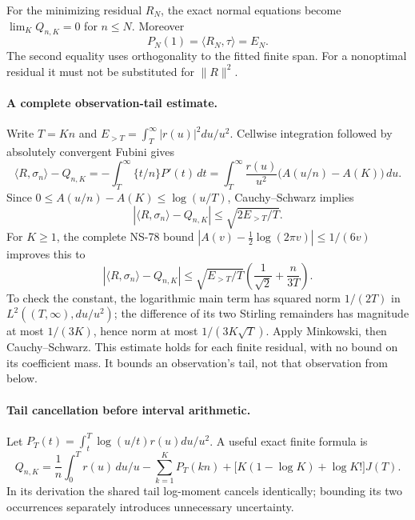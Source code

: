 For the minimizing residual $R_N$, the exact normal equations become
$\lim_K Q_{n,K}=0$ for $n\leq N$. Moreover
\begin{equation}
 P_N(1)=\langle R_N,\tau\rangle=E_N.
 \tag{86.2}
\end{equation}
The second equality uses orthogonality to the fitted finite span. For a
nonoptimal residual it must not be substituted for $\|R\|^2$.

\paragraph{A complete observation-tail estimate.}
Write $T=Kn$ and $E_{>T}=\int_T^\infty|r(u)|^2du/u^2$. Cellwise
integration followed by absolutely convergent Fubini gives
\begin{equation}
 \langle R,\sigma_n\rangle-Q_{n,K}
 =-\int_T^\infty\{t/n\}P'(t)\,dt
 =\int_T^\infty\frac{r(u)}{u^2}
                 \bigl(A(u/n)-A(K)\bigr)\,du.
 \tag{86.3}
\end{equation}
Since $0\leq A(u/n)-A(K)\leq\log(u/T)$, Cauchy--Schwarz implies
\[
 |\langle R,\sigma_n\rangle-Q_{n,K}|
 \leq\sqrt{2E_{>T}/T}.
\]
For $K\geq1$, the complete NS-78 bound
$|A(v)-\tfrac12\log(2\pi v)|\leq1/(6v)$ improves this to
\begin{equation}
 |\langle R,\sigma_n\rangle-Q_{n,K}|
 \leq\sqrt{E_{>T}/T}\left(\frac1{\sqrt2}+\frac{n}{3T}\right).
 \tag{86.4}
\end{equation}
To check the constant, the logarithmic main term has squared norm
$1/(2T)$ in $L^2((T,\infty),du/u^2)$; the difference of its two
Stirling remainders has magnitude at most $1/(3K)$, hence norm at most
$1/(3K\sqrt T)$. Apply Minkowski, then Cauchy--Schwarz. This estimate
holds for each finite residual, with no bound on its coefficient mass.
It bounds an observation's tail, not that observation from below.

\paragraph{Tail cancellation before interval arithmetic.}
Let $P_T(t)=\int_t^T\log(u/t)r(u)du/u^2$. A useful exact finite formula is
\begin{equation}
 Q_{n,K}=\frac1n\int_0^T r(u)\,du/u
 -\sum_{k=1}^K P_T(kn)
 +\bigl[K(1-\log K)+\log K!\bigr]J(T).
 \tag{86.5}
\end{equation}
In its derivation the shared tail log-moment cancels identically; bounding
its two occurrences separately introduces unnecessary uncertainty.

